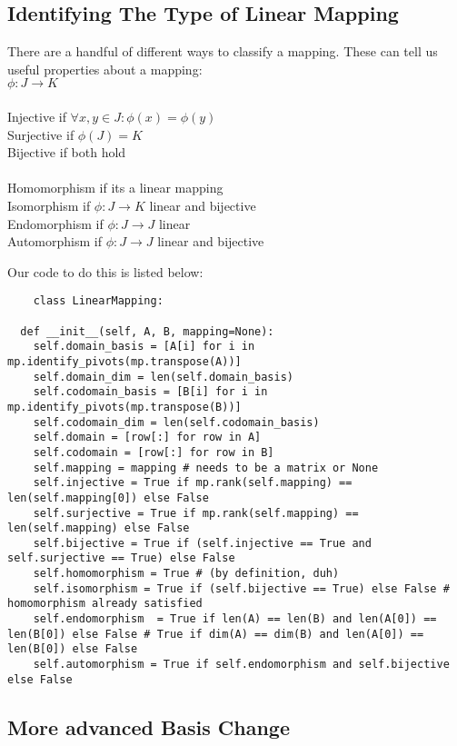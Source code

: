 \documentclass[12pt, a4paper]{article}
\begin{document}
\subsection{Identifying The Type of Linear Mapping}

There are a handful of different ways to classify a mapping. These can tell us useful properties about a mapping:
\\
$\phi : J \rightarrow K $
\\ 
\\
Injective if $ \forall x,y \in J: \phi(x) = \phi(y)$
\\
Surjective if $ \phi(J) = K $
\\
Bijective if both hold
\\
\\
Homomorphism if its a linear mapping
\\
Isomorphism if $ \phi : J \rightarrow K$ linear and bijective
\\
Endomorphism if $ \phi : J \rightarrow J$ linear
\\
Automorphism if $ \phi : J \rightarrow J$ linear and bijective

Our code to do this is listed below:
\begin{lstlisting}
    class LinearMapping:

  def __init__(self, A, B, mapping=None):
    self.domain_basis = [A[i] for i in mp.identify_pivots(mp.transpose(A))]
    self.domain_dim = len(self.domain_basis)
    self.codomain_basis = [B[i] for i in mp.identify_pivots(mp.transpose(B))]
    self.codomain_dim = len(self.codomain_basis)
    self.domain = [row[:] for row in A]
    self.codomain = [row[:] for row in B]
    self.mapping = mapping # needs to be a matrix or None
    self.injective = True if mp.rank(self.mapping) == len(self.mapping[0]) else False
    self.surjective = True if mp.rank(self.mapping) == len(self.mapping) else False
    self.bijective = True if (self.injective == True and self.surjective == True) else False
    self.homomorphism = True # (by definition, duh)
    self.isomorphism = True if (self.bijective == True) else False # homomorphism already satisfied
    self.endomorphism  = True if len(A) == len(B) and len(A[0]) == len(B[0]) else False # True if dim(A) == dim(B) and len(A[0]) == len(B[0]) else False
    self.automorphism = True if self.endomorphism and self.bijective else False
\end{lstlisting}

\subsection{More advanced Basis Change}
\end{document}
